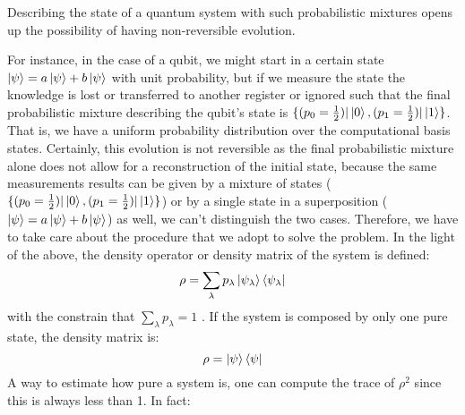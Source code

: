 Describing the state of a quantum system with such probabilistic mixtures opens up the possibility of having non-reversible evolution. 

For instance, in the case of a qubit, we might start in a certain state $\ket{\psi} = a\ket{\psi}+ b\ket{\psi}$ with unit probability, but if we measure the state the knowledge is lost or transferred to another register or ignored such that the final probabilistic mixture describing the qubit’s state is $\{(p_0=\frac{1}{2})|\ket{0}, (p_1=\frac{1}{2})|\ket{1}\}$. That is, we have a uniform probability distribution over the computational basis states. Certainly, this evolution is not reversible as the final probabilistic mixture alone does not allow for a reconstruction of the initial state, because the same measurements results can be given by a mixture of states ($\{(p_0=\frac{1}{2})|\ket{0}, (p_1=\frac{1}{2})|\ket{1}\}$) or by a single state in a superposition ($\ket{\psi} = a\ket{\psi}+ b\ket{\psi}$) as well, we can't distinguish the two cases. Therefore, we have to take care about the procedure that we adopt to solve the problem.
In the light of the above, the density operator or density matrix of the system is defined: 
\begin{equation}
    \rho = \sum_{\lambda} p_{\lambda} \ket{\psi_{\lambda}}\bra{\psi_{\lambda}} 
    \label{eq:density}
\end{equation}
with the constrain that $\sum_{\lambda} p_{\lambda}=1$
. If the system is composed by only one pure state, the density matrix is: 
\begin{equation}
    \rho = \ket{\psi}\bra{\psi}
\end{equation}
A way to estimate how pure a system is, one can compute the trace of $\rho^2$ since this is always less than 1. In fact: 
